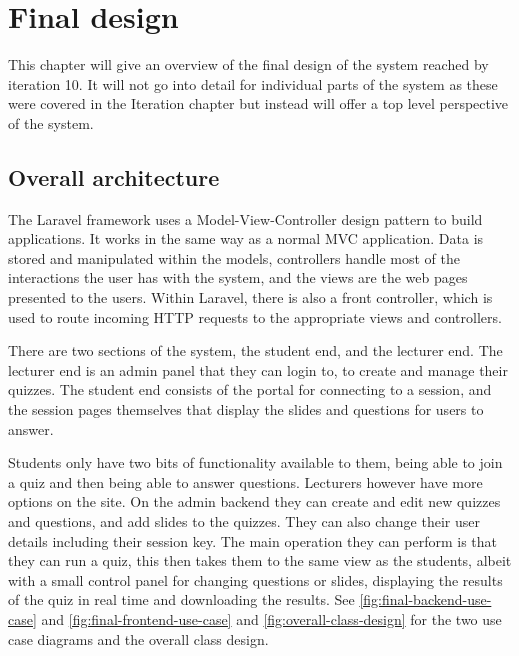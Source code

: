 \chapter{Final design}
This chapter will give an overview of the final design of the system reached by iteration 10. It will not go into detail for individual parts of the system as these were covered in the Iteration chapter but instead will offer a top level perspective of the system.

\section{Overall architecture}
The Laravel framework uses a Model-View-Controller design pattern\cite{mvc} to build applications. It works in the same way as a normal MVC application. Data is stored and manipulated within the models, controllers handle most of the interactions the user has with the system, and the views are the web pages presented to the users. Within Laravel, there is also a front controller, which is used to route incoming HTTP requests to the appropriate views and controllers\cite{Laravel-architechture}.

There are two sections of the system, the student end, and the lecturer end. The lecturer end is an admin panel that they can login to, to create and manage their quizzes. The student end consists of the portal for connecting to a session, and the session pages themselves that display the slides and questions for users to answer.

Students only have two bits of functionality available to  them, being able to join a quiz and then being able to answer questions. Lecturers however have more options on the site. On the admin backend they can create and edit new quizzes and questions, and add slides to the quizzes. They can also change their user details including their session key. The main operation they can perform is that they can run a quiz, this then takes them to the same view as the students, albeit with a small control panel for changing questions or slides, displaying the results of the quiz in real time and downloading the results. See \ref{fig:final-backend-use-case} and \ref{fig:final-frontend-use-case} and \ref{fig:overall-class-design} for the two use case diagrams and the overall class design.

